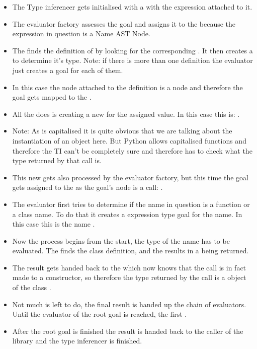 \documentclass[12pt,halfparskip,DIV11,BCOR10mm]{scrreprt}
\begin{document}
\begin{itemize}
	\item The Type inferencer gets initialised with a  with the expression  attached to it.
	\item The evaluator factory assesses the goal and assigns it to the  because the expression in question is a Name AST Node.
	\item The  finds the definition of  by looking for the corresponding . It then creates a  to determine it's type. Note: if there is more than one definition the evaluator just creates a goal for each of them. 
	\item In this case the node attached to the definition is a  node and therefore the goal gets mapped to the .
	\item All the  does is creating a new  for the assigned value. In this case this is: .
	\item Note: As  is capitalised it is quite obvious that we are talking about the instantiation of an object here. But Python allows capitalised functions and therefore the TI can't be completely sure and therefore has to check what the type returned by that call is.
	\item This new  gets also processed by the evaluator factory, but this time the goal gets assigned to the  as the goal's node is a call: .
	\item The evaluator first tries to determine if the name in question is a function or a class name. To do that it creates a expression type goal for the name. In this case this is the name .
	\item Now the process begins from the start, the type of the name  has to be evaluated. The  finds the class definition, and the results in a  being returned.
	\item The result gets handed back to the  which now knows that the call is in fact made to a constructor, so therefore the type returned by the call is a object of the class . 
	\item Not much is left to do, the final result is handed up the chain of evaluators. Until the evaluator of the root goal is reached, the first . 
	\item After the root goal is finished the result is handed back to the caller of the library and the type inferencer is finished.	
\end{itemize}
\end{document}
